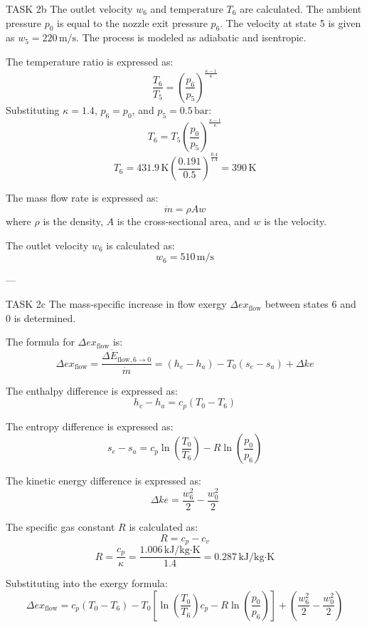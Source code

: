 TASK 2b  
The outlet velocity \( w_6 \) and temperature \( T_6 \) are calculated. The ambient pressure \( p_0 \) is equal to the nozzle exit pressure \( p_6 \). The velocity at state 5 is given as \( w_5 = 220 \, \text{m/s} \). The process is modeled as adiabatic and isentropic.  

The temperature ratio is expressed as:  
\[
\frac{T_6}{T_5} = \left( \frac{p_6}{p_5} \right)^{\frac{\kappa - 1}{\kappa}}
\]  
Substituting \( \kappa = 1.4 \), \( p_6 = p_0 \), and \( p_5 = 0.5 \, \text{bar} \):  
\[
T_6 = T_5 \left( \frac{p_0}{p_5} \right)^{\frac{\kappa - 1}{\kappa}}
\]  
\[
T_6 = 431.9 \, \text{K} \left( \frac{0.191}{0.5} \right)^{\frac{0.4}{1.4}} = 390 \, \text{K}
\]  

The mass flow rate is expressed as:  
\[
\dot{m} = \rho A w
\]  
where \( \rho \) is the density, \( A \) is the cross-sectional area, and \( w \) is the velocity.  

The outlet velocity \( w_6 \) is calculated as:  
\[
w_6 = 510 \, \text{m/s}
\]  

---

TASK 2c  
The mass-specific increase in flow exergy \( \Delta ex_{\text{flow}} \) between states 6 and 0 is determined.  

The formula for \( \Delta ex_{\text{flow}} \) is:  
\[
\Delta ex_{\text{flow}} = \frac{\Delta \dot{E}_{\text{flow},6 \to 0}}{\dot{m}} = (h_e - h_a) - T_0 (s_e - s_a) + \Delta ke
\]  

The enthalpy difference is expressed as:  
\[
h_e - h_a = c_p (T_0 - T_6)
\]  

The entropy difference is expressed as:  
\[
s_e - s_a = c_p \ln \left( \frac{T_0}{T_6} \right) - R \ln \left( \frac{p_0}{p_6} \right)
\]  

The kinetic energy difference is expressed as:  
\[
\Delta ke = \frac{w_6^2}{2} - \frac{w_0^2}{2}
\]  

The specific gas constant \( R \) is calculated as:  
\[
R = c_p - c_v
\]  
\[
R = \frac{c_p}{\kappa} = \frac{1.006 \, \text{kJ/kg·K}}{1.4} = 0.287 \, \text{kJ/kg·K}
\]  

Substituting into the exergy formula:  
\[
\Delta ex_{\text{flow}} = c_p \left( T_0 - T_6 \right) - T_0 \left[ \ln \left( \frac{T_0}{T_6} \right) c_p - R \ln \left( \frac{p_0}{p_6} \right) \right] + \left( \frac{w_6^2}{2} - \frac{w_0^2}{2} \right)
\]